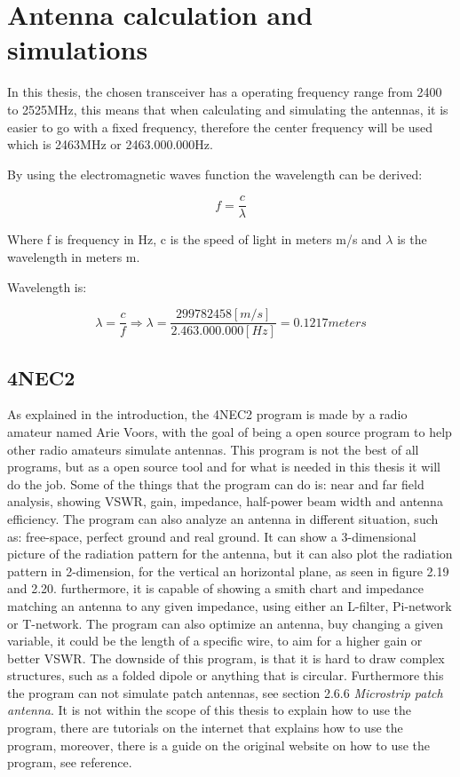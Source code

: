\chapter{Antenna calculation and simulations}
In this thesis, the chosen transceiver has a operating frequency range from 2400 to 2525MHz, this means that when calculating and simulating the antennas, it is easier to go with a fixed frequency, therefore the center frequency will be used which is 2463MHz or 2463.000.000Hz.

By using the electromagnetic waves function the wavelength can be derived:

\begin{equation}
  f = \frac{c}{\lambda}
\end{equation}

Where f is frequency in Hz, c is the speed of light in meters m/s and $\lambda$ is the wavelength in meters m. 

Wavelength is:

\begin{equation}
  \lambda = \frac{c}{f} \Rightarrow \lambda = \frac{299782458 [m/s]}{2.463.000.000 [Hz]} = 0.1217 meters
\end{equation}

\section{4NEC2}
As explained in the introduction, the 4NEC2 program is made by a radio amateur named Arie Voors\cite{4nec2}, with the goal of being a open source program to help other radio amateurs simulate antennas. This program is not the best of all programs, but as a open source tool and for what is needed in this thesis it will do the job. Some of the things that the program can do is: near and far field analysis, showing VSWR, gain, impedance, half-power beam width and antenna efficiency. The program can also analyze an antenna in different situation, such as: free-space, perfect ground and real ground. It can show a 3-dimensional picture of the radiation pattern for the antenna, but it can also plot the radiation pattern in 2-dimension, for the vertical an horizontal plane, as seen in figure 2.19 and 2.20. furthermore, it is capable of showing a smith chart and impedance matching an antenna to any given impedance, using either an L-filter, Pi-network or T-network. The program can also optimize an antenna, buy changing a given variable, it could be the length of a specific wire, to aim for a higher gain or better VSWR. The downside of this program, is that it is hard to draw complex structures, such as a folded dipole or anything that is circular. Furthermore this the program can not simulate patch antennas, see section 2.6.6 \textit{Microstrip patch antenna}. It is not within the scope of this thesis to explain how to use the program, there are tutorials on the internet that explains how to use the program, moreover, there is a guide on the original website on how to use the program, see reference\cite{4NEC2Guide}. 

